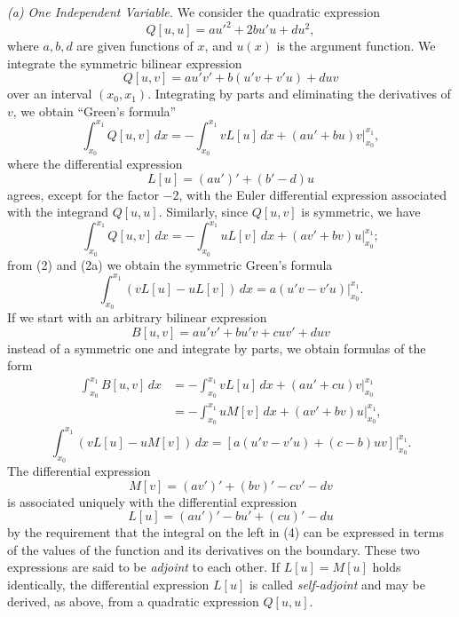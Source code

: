 \textit{(a) One Independent Variable.} We consider the quadratic expression
\[
Q[u,u]=au'^2+2bu'u+du^2,
\]
where $a,b,d$ are given functions of $x$, and $u(x)$ is the argument function. We integrate the symmetric bilinear expression
\[
Q[u,v]=au'v'+b(u'v+v'u)+duv
\]
over an interval $(x_0,x_1)$. Integrating by parts and eliminating the derivatives of $v$, we obtain ``Green's formula''
\begin{equation}\tag{2}
\int_{x_0}^{x_1}Q[u,v] \, dx=-\int_{x_0}^{x_1}vL[u] \, dx+\left.(au'+bu)v\right|_{x_0}^{x_1},
\end{equation}
where the differential expression
\[
L[u]=(au')'+(b'-d)u
\]
agrees, except for the factor $-2$, with the Euler differential expression associated with the integrand $Q[u,u]$. Similarly, since $Q[u,v]$ is symmetric, we have
\begin{equation}\tag{2a}
\int_{x_0}^{x_1}Q[u,v] \, dx=-\int_{x_0}^{x_1}uL[v] \, dx+\left.(av'+bv)u\right|_{x_0}^{x_1};
\end{equation}
from (2) and (2a) we obtain the symmetric Green's formula
\begin{equation}\tag{2b}
\int_{x_0}^{x_1}(vL[u]-uL[v])\,dx=\left.a(u'v-v'u)\right|_{x_0}^{x_1}.
\end{equation}
If we start with an arbitrary bilinear expression
\[
B[u,v]=au'v'+bu'v+cuv'+duv
\]
instead of a symmetric one and integrate by parts, we obtain formulas of the form
\begin{equation}\tag{3}
\begin{aligned}
\int_{x_0}^{x_1}B[u,v]\,dx
&=-\int_{x_0}^{x_1}vL[u]\,dx+\left.(au'+cu)v\right|_{x_0}^{x_1}\\
&=-\int_{x_0}^{x_1}uM[v]\,dx+\left.(av'+bv)u\right|_{x_0}^{x_1},
\end{aligned}
\end{equation}
\begin{equation}\tag{4}
\int_{x_0}^{x_1}(vL[u]-uM[v])\,dx
=\left.[a(u'v-v'u)+(c-b)uv]\right|_{x_0}^{x_1}.
\end{equation}
The differential expression
\[
M[v]=(av')'+(bv)'-cv'-dv
\]
is associated uniquely with the differential expression
\[
L[u]=(au')'-bu'+(cu)'-du
\]
by the requirement that the integral on the left in (4) can be expressed in terms of the values of the function and its derivatives on the boundary. These two expressions are said to be \emph{adjoint} to each other. If $L[u]=M[u]$ holds identically, the differential expression $L[u]$ is called \emph{self-adjoint} and may be derived, as above, from a quadratic expression $Q[u,u]$.

